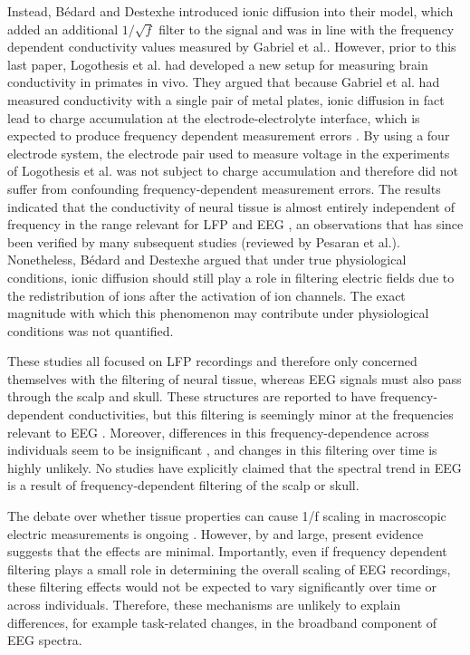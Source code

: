 Instead, Bédard and Destexhe\cite{Bedard2006a} introduced ionic diffusion into their model, which added an additional $1/\sqrt{f}$ filter to the signal and was in line with the frequency dependent conductivity values measured by Gabriel et al.\cite{Gabriel1996}. However, prior to this last paper, Logothesis et al.\cite{Logothetis2007} had developed a new setup for measuring brain conductivity in primates in vivo. They argued that because Gabriel et al. \cite{Gabriel1996} had measured conductivity with a single pair of metal plates, ionic diffusion in fact lead to charge accumulation at the electrode-electrolyte interface, which is expected to produce frequency dependent measurement errors \cite{Warburg1899}. By using a four electrode system, the electrode pair used to measure voltage in the experiments of Logothesis et al.\cite{Logothetis2007} was not subject to charge accumulation and therefore did not suffer from confounding frequency-dependent measurement errors. The results indicated that the conductivity of neural tissue is almost entirely independent of frequency in the range relevant for LFP and EEG \cite{Logothetis2007}, an observations that has since been verified by many subsequent studies (reviewed by Pesaran et al.\cite{Pesaran2018}). Nonetheless, Bédard and Destexhe\cite{Bedard2006a} argued that under true physiological conditions, ionic diffusion should still play a role in filtering electric fields due to the redistribution of ions after the activation of ion channels. The exact magnitude with which this phenomenon may contribute under physiological conditions was not quantified.

These studies all focused on LFP recordings and therefore only concerned themselves with the filtering of neural tissue, whereas EEG signals must also pass through the scalp and skull. These structures are reported to have frequency-dependent conductivities, but this filtering is seemingly minor at the frequencies relevant to EEG \cite{Pfurtscheller1975, Akhtari2002, Pesaran2018}. Moreover, differences in this frequency-dependence across individuals seem to be insignificant \cite{Akhtari2002}, and changes in this filtering over time is highly unlikely. No studies have explicitly claimed that the spectral trend in EEG is a result of frequency-dependent filtering of the scalp or skull.

The debate over whether tissue properties can cause 1/f scaling in macroscopic electric measurements is ongoing \cite{Bedard2017}. However, by and large, present evidence suggests that the effects are minimal. Importantly, even if frequency dependent filtering plays a small role in determining the overall scaling of EEG recordings, these filtering effects would not be expected to vary significantly over time or across individuals. Therefore, these mechanisms are unlikely to explain differences, for example task-related changes, in the broadband component of EEG spectra. 

